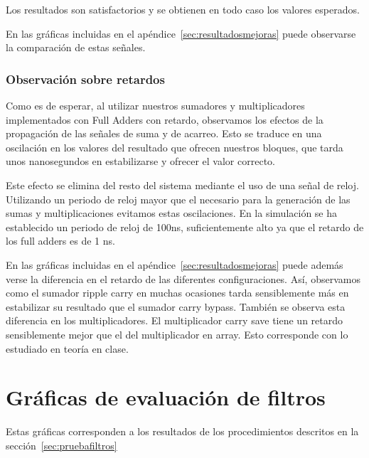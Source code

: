 \documentclass[a4paper,12pt]{article}
\begin{document}
Los resultados son satisfactorios y se obtienen en todo caso los valores esperados.

En las gráficas incluidas en el apéndice~\ref{sec:resultadosmejoras} puede observarse la comparación de estas señales.

\subsubsection*{Observación sobre retardos}
Como es de esperar, al utilizar nuestros sumadores y multiplicadores implementados con Full Adders con retardo, observamos los efectos de la propagación de las señales de suma y de acarreo. Esto se traduce en una oscilación en los valores del resultado que ofrecen nuestros bloques, que tarda unos nanosegundos en estabilizarse y ofrecer el valor correcto.

Este efecto se elimina del resto del sistema mediante el uso de una señal de reloj. Utilizando un periodo de reloj mayor que el necesario para la generación de las sumas y multiplicaciones evitamos estas oscilaciones. En la simulación se ha establecido un periodo de reloj de 100ns, suficientemente alto ya que el retardo de los full adders es de 1 ns.

En las gráficas incluidas en el apéndice~\ref{sec:resultadosmejoras} puede además verse la diferencia en el retardo de las diferentes configuraciones. Así, observamos como el sumador ripple carry en muchas ocasiones tarda sensiblemente más en estabilizar su resultado que el sumador carry bypass. También se observa esta diferencia en los multiplicadores. El multiplicador carry save tiene un retardo sensiblemente mejor que el del multiplicador en array. Esto corresponde con lo estudiado en teoría en clase.

\appendix
\clearpage
\addappheadtotoc
\appendixpage
\section{Gráficas de evaluación de filtros}\label{sec:resultadosfiltros}
Estas gráficas corresponden a los resultados de los procedimientos descritos en la sección~\ref{sec:pruebafiltros}
\end{document}
